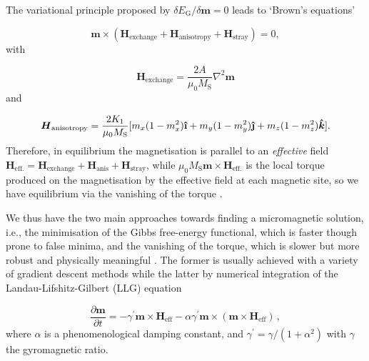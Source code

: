 \documentclass[review,authoryear]{elsarticle}
\newcommand{\ihat}{\boldsymbol{\hat{\textbf{\i}}}}
\newcommand{\jhat}{\boldsymbol{\hat{\textbf{\j}}}}
\begin{document}
The variational principle proposed by \citet{Brown} $\delta E_\text{G} / \delta \boldsymbol{m}=0$ leads to `Brown's equations'
{\par\nobreak\noindent}
\begin{equation}
\boldsymbol{m}\times \left( \boldsymbol{H}_\text{exchange} + \boldsymbol{H}_\text{anisotropy} + \boldsymbol{H}_\text{stray}\right) = 0,
\end{equation}
with
{\par\nobreak\noindent}
\begin{equation}
\boldsymbol{H}_\text{exchange} = \frac{2A}{\mu_0M_\text{S}} \nabla^2\boldsymbol{m}
\end{equation}
and
{\par\nobreak\noindent}
\begin{equation}
\boldsymbol{H}_\text{anisotropy} = \frac{2K_1}{\mu_0M_\text{S}}[m_x(1-m_x^2)\ihat + m_y(1-m_y^2)\jhat + m_z(1-m_z^2)\boldsymbol{\hat{k}}].
\end{equation}
Therefore, in equilibrium the magnetisation is parallel to an \emph{effective} field $\boldsymbol{H}_\text{eff.} = \boldsymbol{H}_\text{exchange} + \boldsymbol{H}_\text{anis} + \boldsymbol{H}_\text{stray}$, while $\mu_0M_\text{S}\boldsymbol{m}\times\boldsymbol{H}_\text{eff.}$ is the local torque produced on the magnetisation by the effective field at each magnetic site, so we have equilibrium via the vanishing of the torque \citep{Brown}.\par

We thus have the two main approaches towards finding a micromagnetic solution, i.e., the minimisation of the Gibbs free-energy functional, which is faster though prone to false minima, and the vanishing of the torque, which is slower but more robust and physically meaningful \citep{Gilbert2004}. The former is usually achieved with a variety of gradient descent methods \citep{Fischbacher2017} while the latter by numerical integration of the Landau-Lifshitz-Gilbert (LLG) equation \citep{Gilbert2004}
{\par\nobreak\noindent}
\begin{equation}\label{llg}
\frac{\partial \boldsymbol{m}}{\partial t} = -\gamma^{'} \boldsymbol{m}\times\boldsymbol{H}_{\text{eff}} - \alpha\gamma^{'}\boldsymbol{m}\times(\boldsymbol{m}\times\boldsymbol{H}_{\text{eff}}) \, ,
\end{equation}
where $\alpha$ is a phenomenological damping constant, and $\gamma^{'} = \gamma /(1+\alpha^2)$ with $\gamma$ the gyromagnetic ratio.\par
\end{document}
